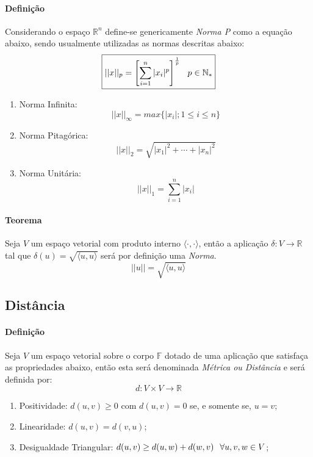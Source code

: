 \documentclass{article}
\begin{document}
            \paragraph{Definição}Considerando o espaço $\mathbb{R}^{n}$ define-se genericamente \textit{Norma P} como a equação abaixo, sendo usualmente utilizadas as normas descritas abaixo:
                \[\boxed{||x||_{p} = \left[\sum\limits_{i = 1}^{n} |x_{i}|^{p}\right]^{\frac{1}p{}} \hspace{2.5mm} p \in \mathbb{N}_{*}}\]
                \begin{enumerate}[noitemsep]
                    \item Norma Infinita:
                        \[\boxed{||x||_{\infty} = max\{|x_{i}|; 1 \leq i \leq n\}}\]
                    \item Norma Pitagórica:
                        \[\boxed{||x||_{2} = \sqrt{|x_{1}|^{2} + \cdots + |x_{n}|^{2}}}\]
                    \item Norma Unitária:
                        \[\boxed{||x||_{1} = \sum\limits_{i = 1}^{n}|x_{i}|}\]
                \end{enumerate}

            \paragraph{Teorema}Seja $V$ um espaço vetorial com produto interno $\langle\cdot,\cdot\rangle$, então a aplicação $\delta : V \rightarrow \mathbb{R}$ tal que  $\delta(u) = \sqrt{\langle u, u\rangle}$ será por definição uma \textit{Norma}.
                \[\boxed{||u|| = \sqrt{\langle u, u \rangle}}\]

        \subsection{Distância}
            \paragraph{Definição}Seja $V$ um espaço vetorial sobre o corpo $\mathbb{F}$ dotado de uma aplicação que satisfaça as propriedades abaixo, então esta será denominada \textit{Métrica ou Distância} e será definida por:
                \[\boxed{d: V\times V \rightarrow \mathbb{R}}\]
                \begin{enumerate}[noitemsep]
                    \item Positividade: $d(u,v) \geq 0$ com $d(u,v) = 0$ se, e somente se, $u = v$;
                    \item Linearidade: $d(u,v) = d(v,u)$;
                    \item Desigualdade Triangular: $d(u,v) \geq d(u,w) + d(w,v) \hspace{2.5mm} \forall u,v,w \in V$;
                \end{enumerate}
\end{document}
